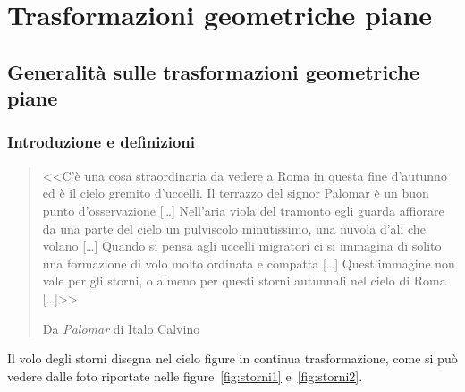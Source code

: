
\chapter{Trasformazioni geometriche piane}\label{chap:trasformazioni}



\section{Generalità sulle trasformazioni geometriche piane}
\label{sect:generalita_trasformazioni}

\subsection{Introduzione e definizioni}

\begin{quote}
<<C'è una cosa straordinaria da vedere a Roma in questa fine 
d'autunno ed è il cielo gremito d'uccelli. Il terrazzo del signor 
Palomar è un buon punto d'osservazione [\ldots{}] Nell'aria viola del 
tramonto egli guarda affiorare da una parte del cielo un pulviscolo 
minutissimo, una nuvola d'ali che volano [\ldots{}] Quando si pensa 
agli uccelli migratori ci si immagina di solito una formazione di volo 
molto ordinata e compatta [\ldots{}] Quest'immagine non vale per gli 
storni, o almeno per questi storni autunnali nel cielo di Roma 
[\ldots{}]>>

\hfill{}Da \emph{Palomar} di Italo Calvino
\end{quote}

Il volo degli storni disegna nel cielo figure in continua 
trasformazione, come si può vedere dalle foto riportate nelle 
figure~\ref{fig:storni1} e~\ref{fig:storni2}.

